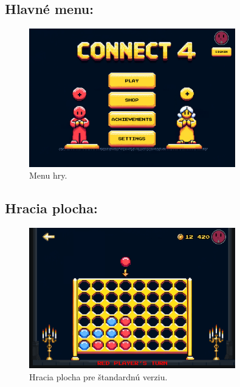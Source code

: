 \documentclass[a4paper, 11pt, onecolumn]{article}
\begin{document}
\subsection*{Hlavné menu:}
\begin{figure}[H]
  \centering
  \includegraphics[width=0.8\textwidth]{Menu.png}
  \caption{ Menu hry.}
  \label{fig:menu_label}
\end{figure}

\subsection*{Hracia plocha:}
\begin{figure}[H]
  \centering
  \includegraphics[width=0.8\textwidth]{Plocha.png}
  \caption{ Hracia plocha pre štandardnú verziu.}
  \label{fig:štandard_label}
\end{figure}
\end{document}
